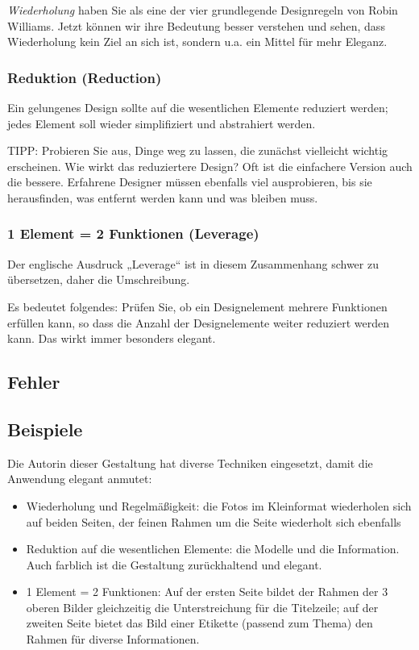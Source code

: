 \emph{Wiederholung} haben Sie als eine der vier grundlegende Designregeln von Robin Williams. Jetzt können wir ihre Bedeutung besser verstehen und sehen, dass Wiederholung kein Ziel  an sich ist, sondern u.a. ein Mittel für mehr Eleganz.
 
\subsubsection*{Reduktion (Reduction)}
Ein gelungenes Design sollte auf die wesentlichen Elemente reduziert werden; jedes Element soll wieder simplifiziert und abstrahiert werden. 

TIPP: Probieren Sie aus, Dinge weg zu lassen, die zunächst vielleicht wichtig erscheinen. Wie wirkt das reduziertere Design? Oft ist die einfachere Version auch die bessere. Erfahrene Designer müssen ebenfalls viel ausprobieren, bis sie herausfinden, was entfernt werden kann und was bleiben muss.
 
\subsubsection*{1 Element = 2 Funktionen (Leverage)}
Der englische Ausdruck „Leverage“ ist in diesem Zusammenhang schwer zu übersetzen, daher die Umschreibung. 

Es bedeutet folgendes: Prüfen Sie, ob ein Designelement mehrere Funktionen erfüllen kann, so dass die Anzahl der Designelemente weiter reduziert werden kann. Das wirkt immer besonders elegant.

\subsection{Fehler}

\subsection{Beispiele}
Die Autorin dieser Gestaltung hat diverse Techniken eingesetzt, damit die Anwendung elegant anmutet:

\begin{itemize}
\item Wiederholung und Regelmäßigkeit: die Fotos im Kleinformat wiederholen sich auf beiden Seiten, der feinen Rahmen um die Seite wiederholt sich ebenfalls
\item Reduktion auf die wesentlichen Elemente: die Modelle und die Information. Auch farblich ist die Gestaltung zurückhaltend und elegant.
\item 1 Element = 2 Funktionen: Auf der ersten Seite bildet der Rahmen der 3 oberen Bilder gleichzeitig die Unterstreichung für die Titelzeile; auf der zweiten Seite bietet das Bild einer Etikette (passend zum Thema) den Rahmen für diverse Informationen.
\end{itemize}


